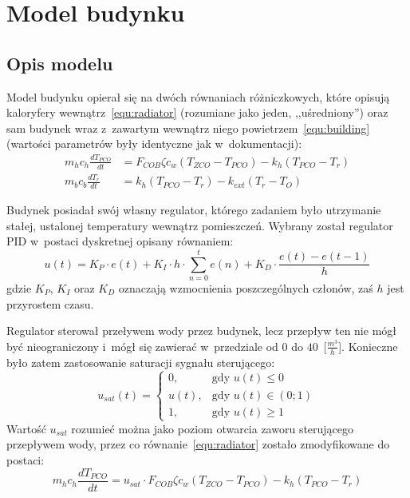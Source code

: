 \documentclass[12pt, a4paper]{article}
\begin{document}
    
    \pagestyle{fancy}
    \renewcommand{\headrulewidth}{0pt}
    \renewcommand{\footrulewidth}{0.4pt}
    \fancyhead{}
    \cfoot{}

	\setcounter{section}{0}
	\setcounter{page}{1}
    \section{Model budynku}
    \subsection{Opis modelu}
    \label{sec:opis_modelu}
    \indent
    
    Model budynku opierał się na dwóch równaniach różniczkowych, które opisują
    kaloryfery wewnątrz~\eqref{equ:radiator} (rozumiane jako jeden,
    ,,uśredniony'') oraz sam budynek wraz z~zawartym wewnątrz niego
    powietrzem~\eqref{equ:building} (wartości parametrów były identyczne jak
    w~dokumentacji):
	\begin{align}
		m_h c_h \frac{dT_{PCO}}{dt} & = F_{COB} \zeta c_w \left( T_{ZCO} - T_{PCO}
		\right) - k_h \left( T_{PCO} - T_r \right)
		\label{equ:radiator} \\
		m_b c_b \frac{dT_r}{dt} & = k_h \left( T_{PCO} - T_r \right) - k_{ext}
		\left( T_r - T_O \right)
		\label{equ:building}
	\end{align}
	
	Budynek posiadał swój własny regulator, którego zadaniem było utrzymanie
	stałej, ustalonej temperatury wewnątrz pomieszczeń. Wybrany został regulator PID
	w~postaci dyskretnej opisany równaniem:
	\begin{equation}
		u(t) = K_P \cdot e(t) + K_I \cdot h \cdot \sum\limits_{n=0}^{t} e(n) +
		K_D \cdot \frac{e(t) - e(t - 1)}{h}
		\label{equ:controller}
	\end{equation}
	gdzie $K_P$, $K_I$ oraz $K_D$ oznaczają wzmocnienia poszczególnych członów, zaś
	$h$ jest przyrostem czasu.
	
	Regulator sterował przeływem wody przez budynek, lecz przepływ ten nie mógł być
	nieograniczony i~mógł się zawierać w~przedziale od $0$ do
	$40$~[$\frac{m^3}{h}$]. Konieczne było zatem zastosowanie saturacji sygnału
	sterującego:
    \begin{equation}
		u_{sat}(t) =
		\begin{cases}
			0, & \mbox{gdy } u(t) \leq 0 \\
			u(t), & \mbox{gdy } u(t) \in (0; 1) \\
			1, & \mbox{gdy } u(t) \geq 1
		\end{cases}
		\label{equ:saturation}
    \end{equation}
    Wartość $u_{sat}$ rozumieć można jako poziom otwarcia zaworu sterującego
    przepływem wody, przez co równanie~\eqref{equ:radiator} zostało
    zmodyfikowane do postaci:
    \begin{equation}
		m_h c_h \frac{dT_{PCO}}{dt} = u_{sat} \cdot F_{COB} \zeta c_w \left( T_{ZCO}
		- T_{PCO} \right) - k_h \left( T_{PCO} - T_r \right)
		\label{equ:radiator_controller}
    \end{equation}
    
\end{document}
